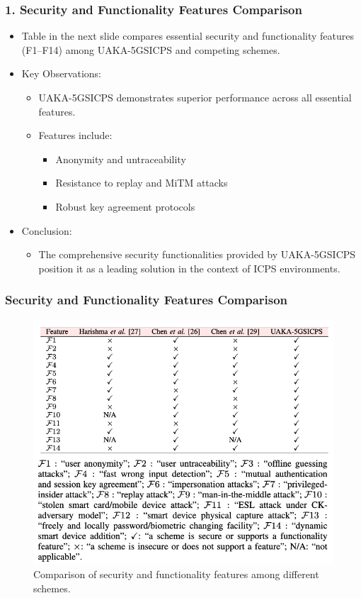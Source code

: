 \documentclass[9pt,handout]{beamer}
\begin{document}
\begin{frame}
    \frametitle{1. Security and Functionality Features Comparison}
    \begin{itemize}
        \item Table in the next slide compares essential security and functionality features (F1–F14) among UAKA-5GSICPS and competing schemes.
        \item Key Observations:
        \begin{itemize}
            \item UAKA-5GSICPS demonstrates superior performance across all essential features.
            \item Features include:
            \begin{itemize}
                \item Anonymity and untraceability
                \item Resistance to replay and MiTM attacks
                \item Robust key agreement protocols
            \end{itemize}
        \end{itemize}
        \item Conclusion:
        \begin{itemize}
            \item The comprehensive security functionalities provided by UAKA-5GSICPS position it as a leading solution in the context of ICPS environments.
        \end{itemize}
    \end{itemize}
\end{frame}

\begin{frame}
    \frametitle{Security and Functionality Features Comparison}
    \begin{figure}
        \centering
        \includegraphics[width=0.9\linewidth]{tabl4.png} %
        \caption{Comparison of security and functionality features among different schemes.}
    \end{figure}
\end{frame}
\end{document}
